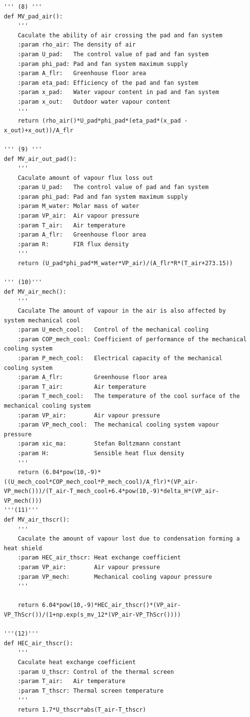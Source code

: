 \documentclass[a4paper]{article}
\begin{document}
\begin{appendices}
\begin{verbatim}
''' (8) '''
def MV_pad_air():
	'''
	Caculate the ability of air crossing the pad and fan system
	:param rho_air:	The density of air
	:param U_pad:	The control value of pad and fan system
	:param phi_pad: Pad and fan system maximum supply
	:param A_flr: 	Greenhouse floor area
	:param eta_pad: Efficiency of the pad and fan system
	:param x_pad:	Water vapour content in pad and fan system
	:param x_out:	Outdoor water vapour content 
	'''
	return (rho_air()*U_pad*phi_pad*(eta_pad*(x_pad - x_out)+x_out))/A_flr

''' (9) '''
def MV_air_out_pad():
	'''
	Caculate amount of vapour flux loss out
	:param U_pad:	The control value of pad and fan system
	:param phi_pad:	Pad and fan system maximum supply
	:param M_water: Molar mass of water
	:param VP_air:	Air vapour pressure 
	:param T_air:	Air temperature
	:param A_flr:	Greenhouse floor area
	:param R:		FIR flux density
	'''
	return (U_pad*phi_pad*M_water*VP_air)/(A_flr*R*(T_air+273.15))

''' (10)'''
def MV_air_mech():
	'''
	Caculate The amount of vapour in the air is also affected by system mechanical cool
	:param U_mech_cool:	  Control of the mechanical cooling
	:param COP_mech_cool: Coefficient of performance of the mechanical cooling system
	:param P_mech_cool:   Electrical capacity of the mechanical cooling system
	:param A_flr:		  Greenhouse floor area
	:param T_air:		  Air temperature
	:param T_mech_cool:	  The temperature of the cool surface of the mechanical cooling system
	:param VP_air:		  Air vapour pressure
	:param VP_mech_cool:  The mechanical cooling system vapour pressure
	:param xic_ma:		  Stefan Boltzmann constant
	:param H:		      Sensible heat flux density
	'''
	return (6.04*pow(10,-9)*((U_mech_cool*COP_mech_cool*P_mech_cool)/A_flr)*(VP_air-VP_mech()))/(T_air-T_mech_cool+6.4*pow(10,-9)*delta_H*(VP_air-VP_mech()))
'''(11)'''
def MV_air_thscr():
    '''
    Caculate the amount of vapour lost due to condensation forming a heat shield
    :param HEC_air_thscr: Heat exchange coefficient 
    :param VP_air:		  Air vapour pressure 
    :param VP_mech:		  Mechanical cooling vapour pressure
    '''
   
    return 6.04*pow(10,-9)*HEC_air_thscr()*(VP_air-VP_ThScr())/(1+np.exp(s_mv_12*(VP_air-VP_ThScr())))

'''(12)'''
def HEC_air_thscr():
	'''
	Caculate heat exchange coefficient
	:param U_thscr:	Control of the thermal screen 
	:param T_air:	Air temperature
	:param T_thscr:	Thermal screen temperature
	'''
	return 1.7*U_thscr*abs(T_air-T_thscr)


\end{verbatim}
\end{appendices}
\end{document}
